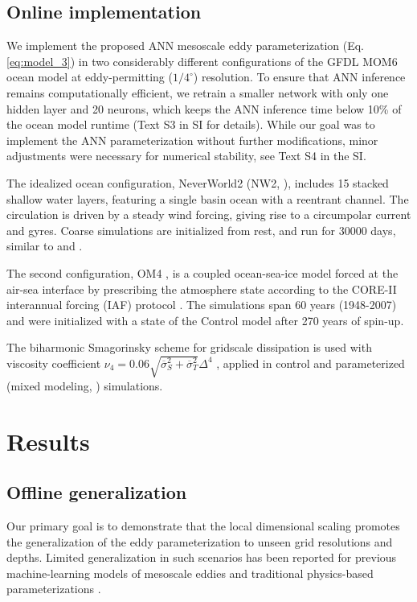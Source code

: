 \documentclass[draft]{agujournal2019}
\begin{document}
\subsection{Online implementation} \label{sec:online_implementation}
We implement the proposed ANN mesoscale eddy parameterization (Eq. \eqref{eq:model_3}) in two considerably different configurations of the GFDL MOM6 ocean model \cite{adcroft2019gfdl} at eddy-permitting ($1/4^\circ$) resolution. To ensure that ANN inference remains computationally efficient, we retrain a smaller network with only one hidden layer and 20 neurons, which keeps the ANN inference time below 10\% of the ocean model runtime (Text S3 in SI for details). While our goal was to implement the ANN parameterization without further modifications, minor adjustments were necessary for numerical stability, see Text S4 in the SI.

The idealized ocean configuration, NeverWorld2 (NW2, ), includes 15 stacked shallow water layers, featuring a single basin ocean with a reentrant channel. The circulation is driven by a steady wind forcing, giving rise to a circumpolar current and gyres. Coarse simulations are initialized from rest, and run for $30000$ days, similar to  and .

The second configuration, OM4 \cite{adcroft2019gfdl}, is a coupled ocean-sea-ice model forced at the air-sea interface by prescribing the atmosphere state according to the CORE-II interannual forcing (IAF) protocol \cite{large2009global}. The simulations span 60 years (1948-2007) and were initialized with a state of the Control model after 270 years of spin-up.

The biharmonic Smagorinsky scheme for gridscale dissipation is used with viscosity coefficient $\nu_4 = 0.06 \sqrt{\overline{\sigma}_S^2+\overline{\sigma}_T^2} \Delta^4$   \cite{adcroft2019gfdl}, applied in control and parameterized (mixed modeling, ) simulations. 




\section{Results}

\subsection{Offline generalization}
Our primary goal is to demonstrate that the local dimensional scaling promotes the generalization of the eddy parameterization to unseen grid resolutions and depths. Limited generalization in such scenarios has been reported for previous machine-learning models of mesoscale eddies \cite{zhang2023implementation, gultekin2024analysis,ross2022benchmarking} and traditional physics-based parameterizations \cite{yankovsky2024}. 
\end{document}
